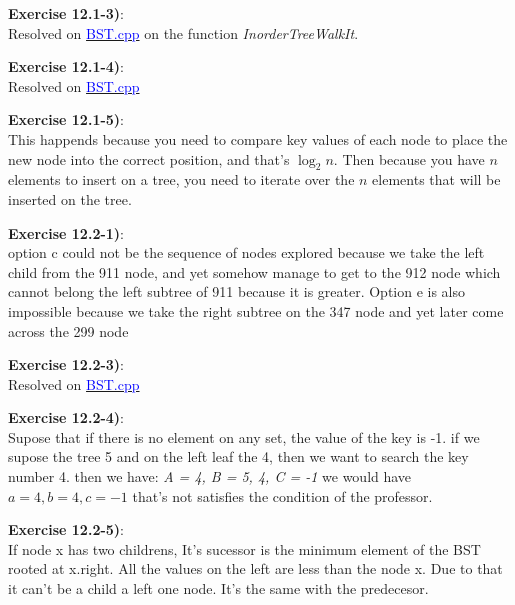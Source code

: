 \documentclass{article}
\newcounter{exercise}[section]   %
\begin{document}
\textbf{Exercise 12.1-3)}:\\
Resolved on \href{https://github.com/Graburr/Algorithms_CLRS_4ed_solutions/tree/main/chapter3/Binary_Search_Trees/BST.cpp}
{\textcolor{Blue}{BST.cpp}} on the function \textit{InorderTreeWalkIt}.

\textbf{Exercise 12.1-4)}:\\
Resolved on \href{https://github.com/Graburr/Algorithms_CLRS_4ed_solutions/tree/main/chapter3/Binary_Search_Trees/BST.cpp}
{\textcolor{Blue}{BST.cpp}}

\textbf{Exercise 12.1-5)}:\\
This happends because you need to compare key values of each node to place the new node into
the correct position, and that's \(\log_2 n\).
Then because you have \(n\) elements to insert on a tree, you need to iterate over the
\(n\) elements that will be inserted on the tree.

\textbf{Exercise 12.2-1)}:\\
option c could not be the sequence of nodes explored because we take the
left child from the 911 node, and yet somehow manage to get to the 912 node
which cannot belong the left subtree of 911 because it is greater. Option e is
also impossible because we take the right subtree on the 347 node and yet later
come across the 299 node

\textbf{Exercise 12.2-3)}:\\
Resolved on \href{https://github.com/Graburr/Algorithms_CLRS_4ed_solutions/tree/main/chapter3/Binary_Search_Trees/BST.cpp}
{\textcolor{Blue}{BST.cpp}}

\textbf{Exercise 12.2-4)}:\\
Supose that if there is no element on any set, the value of the key is -1. if we supose the
tree 5 and on the left leaf the 4, then we want to search the key number 4. then we have: 
\textit{A = {4}, B = {5, 4}, C = {-1}} we would have \(a = 4, b = 4, c = -1\) that's not 
satisfies the condition of the professor.

\textbf{Exercise 12.2-5)}:\\
If node x has two childrens, It's sucessor is the minimum element of the BST rooted at x.right.
All the values on the left are less than the node x. Due to that it can't be a child a left
one node. It's the same with the predecesor.
\end{document}
